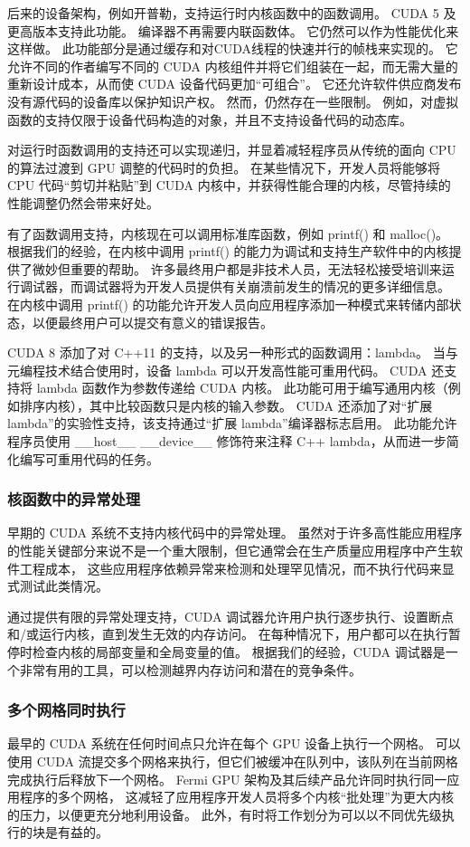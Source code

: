 后来的设备架构，例如开普勒，支持运行时内核函数中的函数调用。 CUDA 5 及更高版本支持此功能。 编译器不再需要内联函数体。 
它仍然可以作为性能优化来这样做。 此功能部分是通过缓存和对CUDA线程的快速并行的帧栈来实现的。 
它允许不同的作者编写不同的 CUDA 内核组件并将它们组装在一起，而无需大量的重新设计成本，从而使 CUDA 设备代码更加“可组合”。 
它还允许软件供应商发布没有源代码的设备库以保护知识产权。 然而，仍然存在一些限制。 
例如，对虚拟函数的支持仅限于设备代码构造的对象，并且不支持设备代码的动态库。

对运行时函数调用的支持还可以实现递归，并显着减轻程序员从传统的面向 CPU 的算法过渡到 GPU 调整的代码时的负担。 
在某些情况下，开发人员将能够将 CPU 代码“剪切并粘贴”到 CUDA 内核中，并获得性能合理的内核，尽管持续的性能调整仍然会带来好处。

有了函数调用支持，内核现在可以调用标准库函数，例如 printf() 和 malloc()。 
根据我们的经验，在内核中调用 printf() 的能力为调试和支持生产软件中的内核提供了微妙但重要的帮助。 
许多最终用户都是非技术人员，无法轻松接受培训来运行调试器，而调试器将为开发人员提供有关崩溃前发生的情况的更多详细信息。 
在内核中调用 printf() 的功能允许开发人员向应用程序添加一种模式来转储内部状态，以便最终用户可以提交有意义的错误报告。

CUDA 8 添加了对 C++11 的支持，以及另一种形式的函数调用：lambda。 
当与元编程技术结合使用时，设备 lambda 可以开发高性能可重用代码。 CUDA 还支持将 lambda 函数作为参数传递给 CUDA 内核。 
此功能可用于编写通用内核（例如排序内核），其中比较函数只是内核的输入参数。 
CUDA 还添加了对“扩展 lambda”的实验性支持，该支持通过“扩展 lambda”编译器标志启用。 
此功能允许程序员使用 \_\_host\_\_ \_\_device\_\_ 修饰符来注释 C++ lambda，从而进一步简化编写可重用代码的任务。

\subsubsection{核函数中的异常处理}
早期的 CUDA 系统不支持内核代码中的异常处理。 
虽然对于许多高性能应用程序的性能关键部分来说不是一个重大限制，但它通常会在生产质量应用程序中产生软件工程成本，
这些应用程序依赖异常来检测和处理罕见情况，而不执行代码来显式测试此类情况。

通过提供有限的异常处理支持，CUDA 调试器允许用户执行逐步执行、设置断点和/或运行内核，直到发生无效的内存访问。 
在每种情况下，用户都可以在执行暂停时检查内核的局部变量和全局变量的值。 
根据我们的经验，CUDA 调试器是一个非常有用的工具，可以检测越界内存访问和潜在的竞争条件。

\subsubsection{多个网格同时执行}
最早的 CUDA 系统在任何时间点只允许在每个 GPU 设备上执行一个网格。 
可以使用 CUDA 流提交多个网格来执行，但它们被缓冲在队列中，该队列在当前网格完成执行后释放下一个网格。 
Fermi GPU 架构及其后续产品允许同时执行同一应用程序的多个网格，
这减轻了应用程序开发人员将多个内核“批处理”为更大内核的压力，以便更充分地利用设备。 
此外，有时将工作划分为可以以不同优先级执行的块是有益的。

